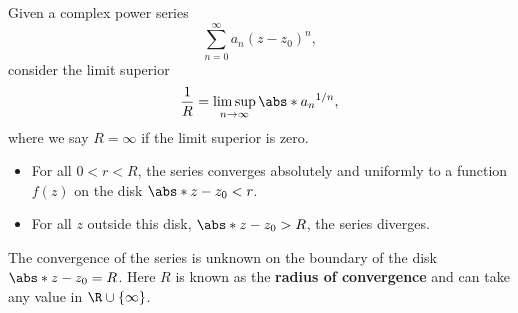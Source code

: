 \documentclass{article}
\begin{document}
\begin{theorem}
    Given a complex power series
    \begin{equation*}
        \sum_{n = 0}^\infty a_n \left( z - z_0 \right)^n,
    \end{equation*}
    consider the limit superior
    \begin{equation*}
        \frac{1}{R} = \limsup_{n \to \infty} \abs*{a_n}^{1/n},
    \end{equation*}
    where we say \(R = \infty\) if the limit superior is zero.
    \begin{itemize}
        \item For all \(0 < r < R\), the series converges absolutely
              and uniformly to a function \(f\left( z \right)\) on the
              disk \(\abs*{z - z_0} < r\).
        \item For all \(z\) outside this disk, \(\abs*{z - z_0} > R\),
              the series diverges.
    \end{itemize}
    The convergence of the series is unknown on the boundary of the disk
    \(\abs*{z - z_0} = R\). Here \(R\) is known as the \textbf{radius of
        convergence} and can take any value in
    \(\R \cup \left\{ \infty \right\}\).
\end{theorem}
\end{document}
